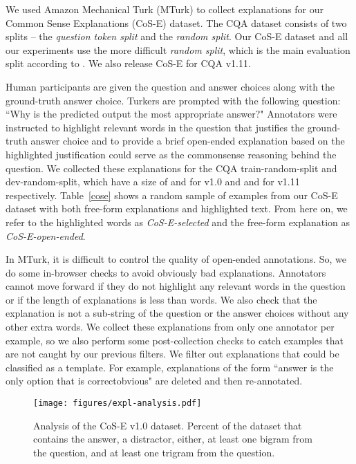 \documentclass[11pt,a4paper]{article}
\begin{document}
We used Amazon Mechanical Turk (MTurk) to collect explanations for our Common Sense Explanations (CoS-E) dataset. 
The CQA dataset consists of two splits -- the {\it question token split} and the {\it random split}.
Our CoS-E dataset and all our experiments use the more difficult {\it random split}, which is the main evaluation split according to \citet{talmor2018commonsenseqa}. We also release CoS-E for CQA v1.11.

Human participants are given the question and answer choices along with the ground-truth answer choice. 
Turkers are prompted with the following question:
``Why is the predicted output the most appropriate answer?" 
Annotators were instructed to highlight relevant
words in the question that justifies the ground-truth answer choice
and to provide
a brief open-ended explanation based on the
highlighted justification could serve as the commonsense reasoning behind the question.
We collected these explanations for the CQA train-random-split and dev-random-split, 
which have a size of  and  for v1.0 and  and  for v1.11 respectively.
Table~\ref{cose} shows a random sample of examples from our CoS-E dataset with both free-form explanations and highlighted text.
From here on, we refer to the highlighted words as \textit{CoS-E-selected} and the free-form explanation as \textit{CoS-E-open-ended}.
 
In MTurk, it is difficult to control the quality of open-ended annotations. 
So, we do some in-browser checks to avoid obviously bad explanations. 
Annotators cannot move forward if they do not highlight any relevant words in the question or if the length of explanations is less than  words.
We also check that the explanation is not a sub-string of the question or the answer choices without any other extra words.
We collect these explanations from only one annotator per example,
so we also perform some post-collection checks to catch examples that are not caught by our previous filters. 
We filter out explanations that could be classified as a template.
For example, explanations of the form ``answer is the only option that is correctobvious" are deleted and then re-annotated.
 \begin{figure}
\centering
 \texttt{[image: figures/expl-analysis.pdf]}
\caption{Analysis of the CoS-E v1.0 dataset. Percent of the dataset that contains the answer, a distractor, either, at least one bigram from the question, and at least one trigram from the question.} \label{expl-analysis}
\vspace{-0.5cm}
 \end{figure}
\end{document}
